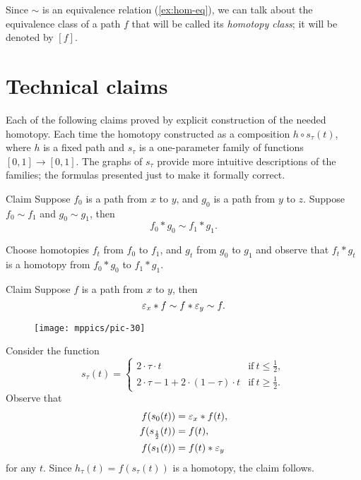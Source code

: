 Since $\sim$ is an equivalence relation (\ref{ex:hom-eq}), we can talk about the equivalence class of a path $f$ that will be called its \emph{homotopy class};
it will be denoted by $[f]$.



\section{Technical claims}

Each of the following claims proved by explicit construction of the needed homotopy.
Each time the homotopy constructed as a composition $h\circ s_\tau(t)$, where $h$ is a fixed path and  $s_\tau$ is a one-parameter family of functions $[0,1]\to [0,1]$.
The graphs of $s_\tau$ provide more intuitive descriptions of the families;
the formulas presented just to make it formally correct.

\begin{thm}{Claim}\label{clm:product}
Suppose $f_0$ is a path from $x$ to $y$,
and 
$g_0$ is a path from $y$ to $z$.
Suppose $f_0\sim f_1$ and $g_0\sim g_1$,
then
\[f_0*g_0\sim f_1*g_1.\]
\end{thm}

Choose homotopies $f_t$ from $f_0$ to $f_1$, and $g_t$ from $g_0$ to $g_1$ and observe that 
$f_t*g_t$ is a homotopy from $f_0*g_0$ to $f_1*g_1$.
\qeds


\begin{thm}{Claim}\label{clm:neutral}
Suppose $f$ is a path from $x$ to $y$, then
\[\varepsilon_x*f\sim f*\varepsilon_y\sim  f.\]
\end{thm}

\begin{wrapfigure}[4]{r}{30mm}
\centering
\vskip-5mm
\texttt{[image: mppics/pic-30]}
\end{wrapfigure}

Consider the function
\[s_\tau(t)=
\begin{cases}
2\cdot \tau \cdot t&\text{if}\ t\le \tfrac12,
\\
2\cdot\tau-1+2\cdot (1-\tau) \cdot t&\text{if}\ t\ge \tfrac12.
\end{cases}
\]
Observe that 
\begin{align*}
f(s_0(t))&=\varepsilon_x*f(t),
\\
f(s_{\frac12}(t))&=f(t),
\\
f(s_1(t))&=f(t)*\varepsilon_y
\end{align*}
for any $t$.
Since $h_\tau(t)=f(s_\tau(t))$ is a homotopy, the claim follows.
\qeds

